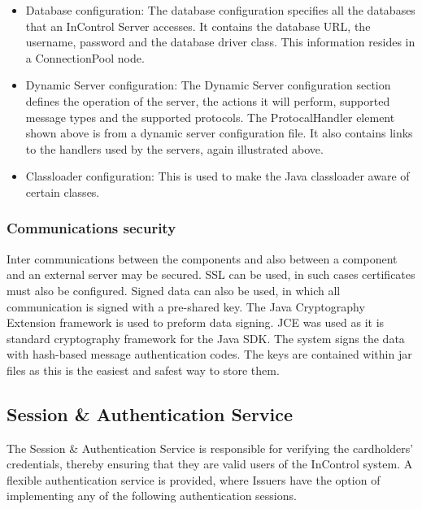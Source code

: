 \documentclass[a4paper, 11pt, titlepage]{article}
\begin{document}
\begin{itemize}
\begin{verbatim}
    <param name = "Append" value = "false"/> 
    <param name = "Encoding" value = "UTF-8" /> 
    <layout class = "org.apache.log4j.PatternLayout"> 
        <param name = "ConversionPattern" 
            value = "%d{dd,MM HH:mm:ss:SSS} 
                [%t] %-5p %c{2} - %m\n"/> 
    </layout> 
</appender> 
\end{verbatim} 
\item Database configuration: The database configuration specifies all the databases that an InControl Server accesses. It contains the database URL, the username, password and the database driver class. This information resides in a ConnectionPool node.  
\item Dynamic Server configuration: The Dynamic Server configuration section defines the operation of the server, the actions it will perform, supported message types and the supported protocols. The ProtocalHandler element shown above is from a dynamic server configuration file. It also contains links to the handlers used by the servers, again illustrated above. 
\item Classloader configuration: This is used to make the Java classloader aware of certain classes.
\end{itemize} 
\subsubsection{Communications security} 
Inter communications between the components and also between a component and an external server may be secured. SSL can be used, in such cases certificates must also be configured. Signed data can also be used, in which all communication is signed with a pre-shared key. The Java Cryptography Extension framework is used to preform data signing. JCE was used as it is standard cryptography framework for the Java SDK. The system signs the data with hash-based message authentication codes. The keys are contained within jar files as this is the easiest and safest way to store them. 
 
\subsection{Session \& Authentication Service} 
The Session \& Authentication Service is responsible for verifying the cardholders’ credentials, thereby ensuring that they are valid users of the InControl system. 
A flexible authentication service is provided, where Issuers have the option of implementing any of the following authentication sessions. 
 
\end{document}
